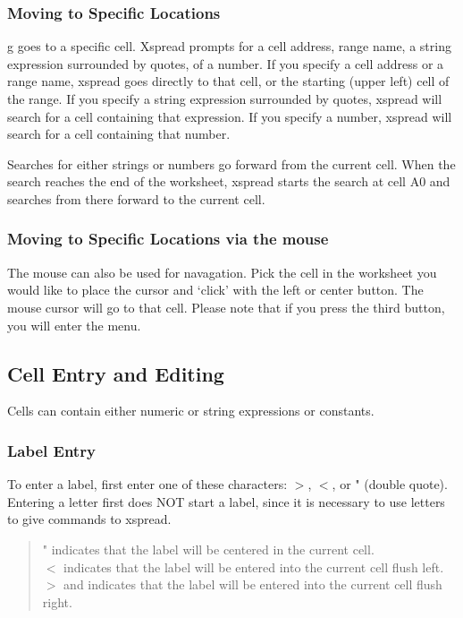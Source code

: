 \subsubsection*{Moving to Specific Locations}

    g goes to a specific cell.  Xspread prompts for a cell address, range 
name, a string expression surrounded by quotes, of a number.  If you specify a 
cell address or a range name, xspread goes directly to that cell, or the 
starting (upper left) cell of the range.  If you specify a string expression 
surrounded by quotes, xspread will search for a cell containing that 
expression.  If you specify a number, xspread will search for a cell 
containing that number.

    Searches for either strings or numbers go forward from the current cell.  
When the search reaches the end of the worksheet, xspread starts the search at 
cell A0 and searches from there forward to the current cell.

\subsubsection*{Moving to Specific Locations via the mouse}

    The mouse can also be used for navagation.  Pick the cell in the worksheet you
would like to place the cursor and `click' with the left or center button.  The
mouse cursor will go to that cell.  Please note that if you press the third
button, you will enter the menu.

\subsection*{Cell Entry and Editing}

    Cells can contain either numeric or string expressions or constants.

\subsubsection*{Label Entry}

    To enter a label, first enter one of these characters: $>$, $<$, or "
(double quote).  Entering a letter first does NOT start a label, since
it is necessary to use letters to give commands to xspread.
\begin{quote}
    " indicates that the label will be centered in the current cell.\\
    $<$ indicates that the label will be entered into the current cell flush 
    left.\\
    $>$ and indicates that the label will be entered into the current cell 
    flush right.
\end{quote}

